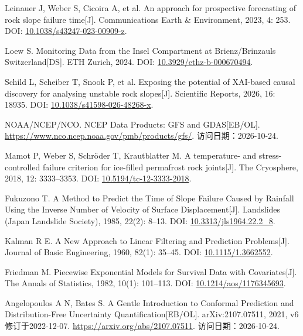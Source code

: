  Leinauer J, Weber S, Cicoira A, et al. An approach for prospective forecasting of rock slope failure time[J]. Communications Earth \& Environment, 2023, 4: 253. DOI: \href{https://doi.org/10.1038/s43247-023-00909-z}{10.1038/s43247-023-00909-z}.

 Loew S. Monitoring Data from the Insel Compartment at Brienz/Brinzauls Switzerland[DS]. ETH Zurich, 2024. DOI: \href{https://doi.org/10.3929/ethz-b-000670494}{10.3929/ethz-b-000670494}.

 Schild L, Scheiber T, Snook P, et al. Exposing the potential of XAI-based causal discovery for analysing unstable rock slopes[J]. Scientific Reports, 2026, 16: 18935. DOI: \href{https://doi.org/10.1038/s41598-026-48268-x}{10.1038/s41598-026-48268-x}.

 NOAA/NCEP/NCO. NCEP Data Products: GFS and GDAS[EB/OL]. \url{https://www.nco.ncep.noaa.gov/pmb/products/gfs/}. 访问日期：2026-10-24.

 Mamot P, Weber S, Schr\"oder T, Krautblatter M. A temperature- and stress-controlled failure criterion for ice-filled permafrost rock joints[J]. The Cryosphere, 2018, 12: 3333--3353. DOI: \href{https://doi.org/10.5194/tc-12-3333-2018}{10.5194/tc-12-3333-2018}.

 Fukuzono T. A Method to Predict the Time of Slope Failure Caused by Rainfall Using the Inverse Number of Velocity of Surface Displacement[J]. Landslides (Japan Landslide Society), 1985, 22(2): 8--13. DOI: \href{https://doi.org/10.3313/jls1964.22.2_8}{10.3313/jls1964.22.2\_8}.

 Kalman R E. A New Approach to Linear Filtering and Prediction Problems[J]. Journal of Basic Engineering, 1960, 82(1): 35--45. DOI: \href{https://doi.org/10.1115/1.3662552}{10.1115/1.3662552}.

 Friedman M. Piecewise Exponential Models for Survival Data with Covariates[J]. The Annals of Statistics, 1982, 10(1): 101--113. DOI: \href{https://doi.org/10.1214/aos/1176345693}{10.1214/aos/1176345693}.

 Angelopoulos A N, Bates S. A Gentle Introduction to Conformal Prediction and Distribution-Free Uncertainty Quantification[EB/OL]. arXiv:2107.07511, 2021, v6修订于2022-12-07. \url{https://arxiv.org/abs/2107.07511}. 访问日期：2026-10-24.
